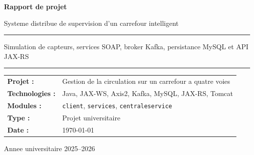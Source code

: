 \documentclass[12pt,a4paper]{report}
\begin{document}
\begin{titlepage}
    \centering
    \vspace*{2cm}

    {\Huge\bfseries\color{titleblue} Rapport de projet\par}
    \vspace{0.6cm}
    {\LARGE Systeme distribue de supervision d'un carrefour intelligent\par}

    \vspace{1.5cm}
    \rule{0.9\textwidth}{1.2pt}\par
    \vspace{0.4cm}
    {\Large Simulation de capteurs, services SOAP, broker Kafka, persistance MySQL et API JAX-RS\par}
    \vspace{0.4cm}
    \rule{0.9\textwidth}{1.2pt}\par

    \vspace{2cm}

    \begin{tabular}{>{\bfseries}p{4cm}p{8cm}}
        Projet : & Gestion de la circulation sur un carrefour a quatre voies \\
        Technologies : & Java, JAX-WS, Axis2, Kafka, MySQL, JAX-RS, Tomcat \\
        Modules : & \texttt{client}, \texttt{services}, \texttt{centraleservice} \\
        Type : & Projet universitaire \\
        Date : & \today \\
    \end{tabular}

    \vfill

    \begin{center}
    \end{center}

    \vfill
    {\large Annee universitaire 2025--2026\par}
\end{titlepage}

\tableofcontents
\clearpage
\end{document}
